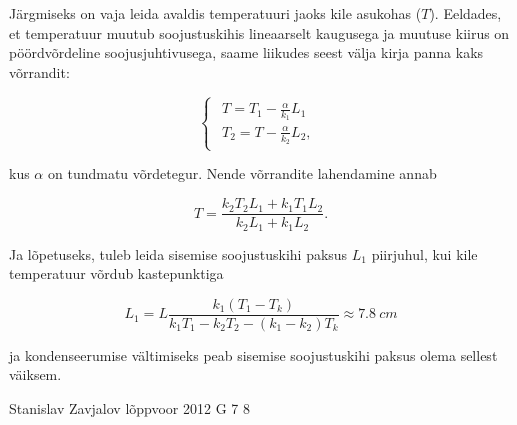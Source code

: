 \documentclass[11pt, twoside]{article}
\begin{document}
{{Järgmiseks on vaja leida avaldis temperatuuri jaoks kile asukohas
($T$). Eeldades, et temperatuur muutub soojustuskihis lineaarselt
kaugusega ja muutuse kiirus on pöördvõrdeline soojusjuhtivusega, saame
liikudes seest välja kirja panna kaks võrrandit:

\begin{equation*}
\begin{cases}
\begin{array}{c}
T=T_{1}-\frac{\alpha}{k_{1}}L_{1}\\
T_{2}=T-\frac{\alpha}{k_{2}}L_{2},
\end{array}
\end{cases}
\end{equation*}

\noindent kus $\alpha$ on tundmatu võrdetegur. Nende võrrandite lahendamine
annab

\begin{equation*}
T=\frac{k_{2}T_{2}L_{1}+k_{1}T_{1}L_{2}}{k_{2}L_{1}+k_{1}L_{2}}.
\end{equation*}

Ja lõpetuseks, tuleb leida sisemise soojustuskihi paksus $L_{1}$
piirjuhul, kui kile temperatuur võrdub kastepunktiga

\begin{equation*}
L_{1}=L\frac{k_{1}\left(T_{1}-T_{k}\right)}{k_{1}T_{1}-k_{2}T_{2}-\left(k_{1}-k_{2}\right)T_{k}}\approx\SI{7.8}{cm}
\end{equation*}

\noindent ja kondenseerumise vältimiseks peab sisemise soojustuskihi
paksus olema sellest väiksem.
\fi
}

{Stanislav Zavjalov} %
{lõppvoor} %
{2012} %
{G 7} %
{8} %
{

}}
\end{document}
